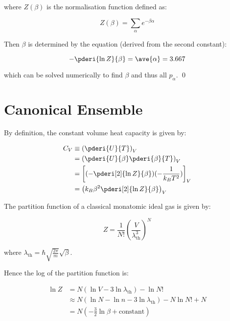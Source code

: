 \documentclass[12pt]{article}
\begin{document}
where $Z(\beta)$ is the normalisation function defined as:

\begin{equation}
    Z(\beta) = \sum_{\alpha} e^{-\beta \alpha}
\end{equation}

Then $\beta$ is determined by the equation (derived from the second constant):

\begin{equation}
    - \pderi{\ln{Z}}{\beta} = \ave{\alpha} = 3.667
\end{equation}

which can be solved numerically to find $\beta$ and thus all $p_{\alpha}$.
\qed


\pagebreak
\section*{Canonical Ensemble}



By definition, the constant volume heat capacity is given by:

\begin{equation}
    \begin{split}
        C_{V} &\equiv \left( \pderi{U}{T} \right)_{V} \\
        &= \left( \pderi{U}{\beta} \pderi{\beta}{T} \right)_{V} \\
        &= \left[ (-\pderi[2]{\ln{Z}}{\beta}) (-\frac{1}{k_{B} T^2}) \right]_{V} \\
        &= \left( k_{B} \beta^{2} \pderi[2]{\ln{Z}}{\beta} \right)_{V}
    \end{split}
\end{equation}

The partition function of a classical monatomic ideal gas is given by:

\begin{equation}
    Z = \frac{1}{N!} \left( \frac{V}{\lambda_{\text{th}}^{3}} \right)^{N}
\end{equation}

where $\lambda_{\text{th}} = \hbar \sqrt{\frac{2\pi}{m}} \sqrt{\beta}$.

Hence the log of the partition function is:

\begin{equation}
    \begin{split}
        \ln{Z} &= N (\ln{V} - 3\ln{\lambda_{\text{th}}}) - \ln{N!} \\
        &\approx N (\ln{N} - \ln{n} - 3\ln{\lambda_{\text{th}}}) - N \ln{N!} + N \\
        &= N \left( -\frac{3}{2} \ln{\beta} + \text{constant} \right)
    \end{split}
\end{equation}
\end{document}
